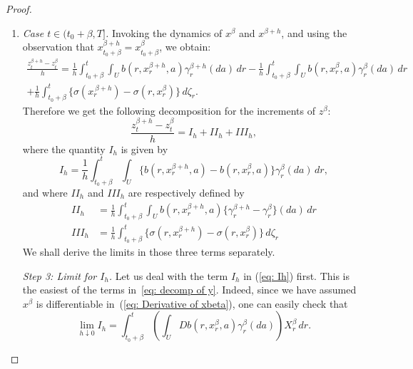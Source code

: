 \documentclass[10pt,a4paper]{amsart}
\newcommand{\ga}{\gamma}
\newcommand{\lp}{\left(}
\newcommand{\rp}{\right)}
\begin{document}
\begin{proof}
\begin{enumerate}[wide, labelwidth=!, labelindent=0pt, label=\emph{(\roman*)}]
    \item \emph{Case $t\in (t_{0}+\beta,T]$.}
   Invoking the dynamics of $x^{\beta}$ and $x^{\beta+h}$, and using the observation that $x^{\beta+h}_{t_{0}+\beta}=x^{\beta}_{t_{0}+\beta}$, we obtain:
   \begin{multline*}
       \frac{z_{t}^{\beta+h}-z^{\beta}_{t}}{h}
       =\frac{1}{h}\int_{t_{0}+\beta}^{t}\int_{U}b(r,x_{r}^{\beta+h},a)\ga_{r}^{\beta+h}(da)\,dr 
       -\frac{1}{h}\int_{t_{0}+\beta}^{t}\int_Ub(r,x_{r}^{\beta},a)\ga_{r}^{\beta}(da)\,dr\\
       +\frac{1}{h}\int_{t_{0}+\beta}^{t}\{\sigma(x_{r}^{\
       \beta+h})-\sigma(r,x_{r}^{\beta})\}\,d\zeta_{r}.
\end{multline*}
Therefore we get the following decomposition for the increments of $z^{\beta}$:
\begin{equation}
    \frac{z^{\beta+h}_{t}-z^{\beta}_{t}}{h}=I_{h}+II_{h}+III_{h},
\label{eq: decomp of y}
\end{equation}
where the quantity $I_{h}$ is given by
\begin{equation}\label{eq: Ih}
 I_{h} 
 =\frac{1}{h}\int_{t_{0}+\beta}^{t}\int_{U}\{b(r,x_{r}^{\beta+h},a)-b(r,x_{r}^{\beta},a)\}\ga_{r}^{\beta}(da)\,dr ,
\end{equation}
and where $II_{h}$ and $III_{h}$ are respectively defined by
\begin{align}
  \label{eq: IIh} II_{h}&=\frac{1}{h}\int_{t_{0}+\beta}^{t}\int_{U}b(r,x_{r}^{\beta+h},a)\{\ga^{\beta+h}_{r}-\ga^{\beta}_{r}\}(da)\, dr\\
     \label{eq: IIIh}  III_{h}&=\frac{1}{h} \int_{t_{0}+\beta}^{t}\{\sigma(r,x_{r}^{\beta+h})-\sigma(r,x_{r}^{\beta})\}\,d\zeta_{r}
\end{align}
We shall derive the limits in those three terms separately.


\smallskip
\noindent
\textit{Step 3: Limit for $I_{h}$.} 
Let us deal with the term $I_{h}$ in (\ref{eq: Ih}) first. This is the easiest of the terms in~\eqref{eq: decomp of y}. Indeed, since we have assumed $x^{\beta}$ is differentiable in~(\ref{eq: Derivative of xbeta}), one can easily check that
\begin{equation}
\lim_{h\downarrow0}I_{h}=\int_{t_{0}+\beta}^{t}\lp\int_{U}Db(r,x_{r}^{\beta},a)\ga_{r}^{\beta}(da) \rp X_{r}^{\beta}\,dr.
\label{eq: limit Ih}\end{equation}



\end{enumerate}
\end{proof}
\end{document}
